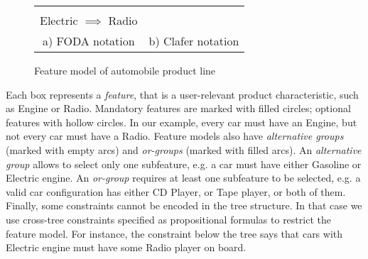 \documentclass{llncs}
\begin{document}
\begin{figure}[t]
  \begin{center}
    \begin{tabular}{cc}
      \begin{minipage}[t]{8cm}
        \begin{center}
          \scalebox{1.0}{
            \begin{fbundle}{\featbox{Automobile}}
              \fchunk[m]{
                \begin{fbundle}[x][1]{\featbox{Engine}}
                  \fchunk{\featbox{Gasoline}}
                  \fchunk{\featbox{Electric}}
                \end{fbundle}
              }
              \fchunk[o]{
                \begin{fbundle}[o][1]{\featbox{Radio}}
                  \fchunk{\featbox{CD Player}}
                  \fchunk{\featbox{Tape}}
                \end{fbundle}
              }
            \end{fbundle}
          }
        \end{center}
      \end{minipage}
      &
      \begin{minipage}{3cm}
        
      \end{minipage}\\
      \textsf{Electric} $\implies$ \textsf{Radio}
      &
      \\[0.2cm]
      a) FODA notation & b) Clafer notation
    \end{tabular}
  \end{center}
  \caption{Feature model of automobile product line\label{fig:autofm}}
\end{figure}

Each box represents a \emph{feature}, that is a user-relevant product characteristic, such as \textsf{Engine} or \textsf{Radio}. Mandatory features are marked with filled circles; optional features with hollow circles. In our example, every car must have an \textsf{Engine}, but not every car must have a \textsf{Radio}. Feature models also have \emph{alternative groups} (marked with empty arcs) and \emph{or-groups} (marked with filled arcs). An \emph{alternative group} allows to select only one subfeature, e.g. a car must have either \textsf{Gasoline} or \textsf{Electric} engine. An \emph{or-group} requires at least one subfeature to be selected, e.g. a valid car configuration has either \textsf{CD Player}, or \textsf{Tape} player, or both of them. Finally, some constraints cannot be encoded in the tree structure. In that case we use cross-tree constraints specified as propositional formulas to restrict the feature model. For instance, the constraint below the tree says that cars with \textsf{Electric} engine must have some \textsf{Radio} player on board.
\end{document}
